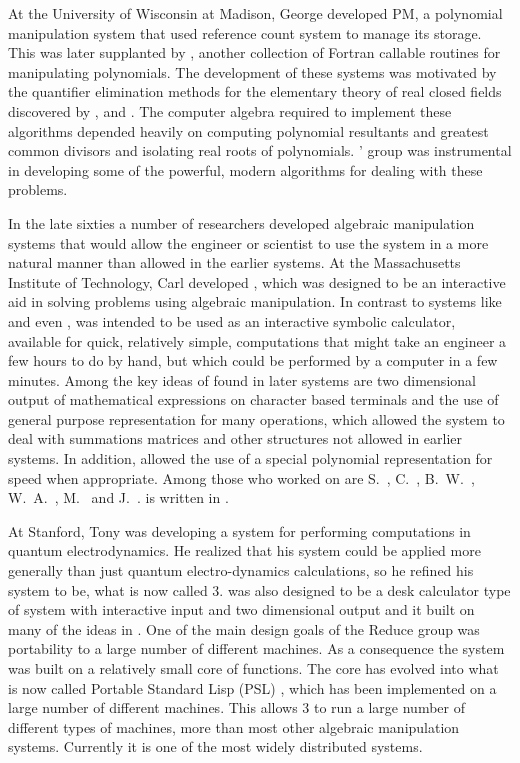 At the University of Wisconsin at Madison, George {\Collins} developed
PM, a polynomial manipulation system that used reference count system
to manage its storage.  This was later supplanted by , another
collection of Fortran callable routines for manipulating polynomials.
The development of these systems was motivated by the quantifier
elimination methods for the elementary theory of real closed fields
discovered by {\Tarski} \cite{Tarski}, {\Seidenberg} \cite{Seidenberg}
and {\CohenP} \cite{Cohen69}.  The computer algebra required to
implement these algorithms depended heavily on computing polynomial
resultants and greatest common divisors and isolating real roots of
polynomials.  {\Collins}' group was instrumental in developing some of
the powerful, modern algorithms for dealing with these problems.

\smallskip

In the late sixties a number of researchers developed algebraic
manipulation systems that would allow the engineer or scientist to use
the system in a more natural manner than allowed in the earlier
systems.  At the Massachusetts Institute of Technology, Carl
{\Engleman} developed {\Mathlab}, which was designed to be an
interactive aid in solving problems using algebraic manipulation.  In
contrast to systems like {\Sac} and even {\Altran}, {\Mathlab} was
intended to be used as an interactive symbolic calculator, available
for quick, relatively simple, computations that might take an engineer
a few hours to do by hand, but which could be performed by a computer
in a few minutes.  Among the key ideas of {\Mathlab} found in later
systems are two dimensional output of mathematical expressions on
character based terminals and the use of general purpose
representation for many operations, which allowed the system to deal
with summations matrices and other structures not allowed in earlier
systems.  In addition, {\Mathlab} allowed the use of a special
polynomial representation for speed when appropriate.  Among those who
worked on {\Mathlab} are S.~{\BloomS}, C.~{\Engleman},
B.~W.~{\Diffie}, W.~A.~{\MartinW}, M.~{\Manove} and J.~{\MosesJ}.
{\Mathlab} is written in {\Lisp}.

At Stanford, Tony {\Hearn} was developing a system for performing
computations in quantum electrodynamics.  He realized that his system
could be applied more generally than just quantum electro-dynamics
calculations, so he refined his system to be, what is now called
{\Reduce} 3.  {\Reduce} was also designed to be a desk calculator type
of system with interactive input and two dimensional output and it
built on many of the ideas in {\Mathlab}.  One of the main design
goals of the Reduce group was portability to a large number of
different machines.  As a consequence the system was built on a
relatively small core of {\Lisp} functions.  The core has evolved into
what is now called Portable Standard Lisp (PSL) \cite{PSL:Manual}, which has been implemented on a large
number of different machines.  This allows {\Reduce} 3 to run a large
number of different types of machines, more than most other algebraic
manipulation systems.  Currently it is one of the most widely
distributed systems.

